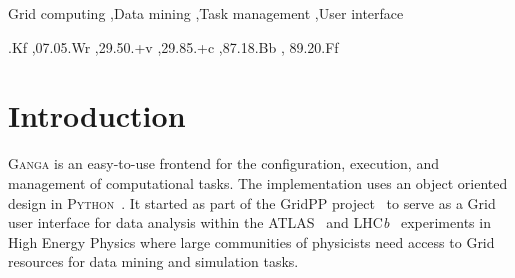 \documentclass{elsart}
\def\lhcb {LHC{\em b\/}\xspace}
\def\atlas {ATLAS\xspace}
\def\ganga {\textsc{Ganga}\xspace}
\def\python {\textsc{Python}\xspace}
\def\grid {Grid\xspace}
\begin{document}
\begin{frontmatter}
\begin{abstract}
  We present the computational task-management tool \ganga which allows for
  the specification, submission, bookkeeping and post processing of
  computational tasks on a wide set of distributed resources.  \ganga
  effectively provides a homogeneous environment for processing data on
  heterogeneous resources. We provide examples from High Energy Physics,
  demonstrating how an analysis can be developed on a local system and then
  transparently moved to a \grid system for processing of all available data.
  \ganga offers an API which can be used via an interactive interface, in
  scripts, or through a GUI. Specific knowledge about types of tasks or
  computational resources is provided at run-time through a plug-in system, 
  making new developments easy to integrate. We give an overview of the
  \ganga architecture, give examples of current use, and demonstrate how
  \ganga can be used in many different areas of science.
\end{abstract}

\begin{keyword}
Grid computing \sep Data mining \sep Task management \sep User interface





  .Kf \sep 07.05.Wr \sep 29.50.+v \sep 29.85.+c \sep 87.18.Bb \sep
  89.20.Ff
\end{keyword}
\end{frontmatter}


\section{Introduction}
\label{sec:intro}
\ganga is an easy-to-use frontend for the configuration, execution, and
management of computational tasks. The implementation uses an object oriented
design in \python~\cite{python}. It started as part of the GridPP
project~\cite{Faulkner:2006px} to serve as a \grid user interface for data
analysis within the \atlas~\cite{Armstrong:1994it} and
\lhcb~\cite{Amato:1998xt} experiments in High Energy Physics where large
communities of physicists need access to \grid resources for data mining
and simulation tasks.
\end{document}
